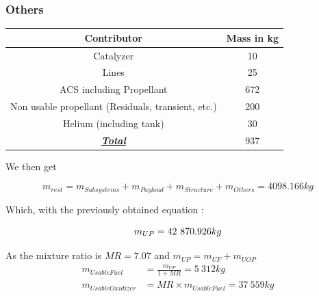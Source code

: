 \hypertarget{header-n156}{%
	\subsubsection{Others}\label{header-n156}}

\begin{longtable}[]{@{}cc@{}}
	\toprule
	Contributor & Mass in kg\tabularnewline
	\midrule
	\endhead
	Catalyzer & 10\tabularnewline
	Lines & 25\tabularnewline
	ACS including Propellant & 672\tabularnewline
	Non usable propellant (Residuals, transient, etc.) & 200\tabularnewline
	Helium (including tank) & 30\tabularnewline
	\underline{\textbf{\emph{Total}}} & 937\tabularnewline
	\bottomrule
\end{longtable}

We then get

\[m_{rest} = m_{Sub systems} + m_{Payload} + m_{Structure} + m_{Others} = 4098.166kg\]

Which, with the previously obtained equation :

\[m_{UP} = 42\ 870.926kg\\\]

As the mixture ratio is $MR = 7.07$ and $m_{UP} = m_{UF} + m_{UOP}$\\
\begin{align*}
m_{UsableFuel} &= \frac{m_{UP}}{1 + MR} = 5\ 312kg\\
m_{UsableOxidizer} &= MR \times m_{UsableFuel} =37\ 559kg
\end{align*}

